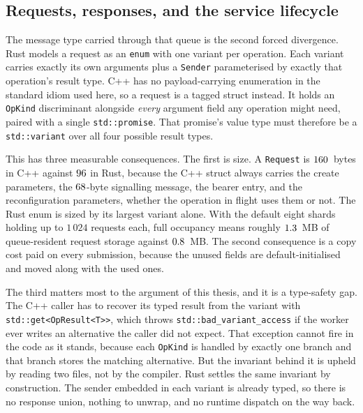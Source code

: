 \documentclass[english,oneside,a4paper,censored,csm,software-track-2020]{HYthesisML}
\begin{document}
\subsection{Requests, responses, and the service lifecycle}\label{sec:tagged}
\label{sec:request}
The message type carried through that queue is the second forced divergence. Rust models a
request as an \texttt{enum} with one variant per
operation. Each variant carries exactly its own arguments plus a \texttt{Sender} parameterised
by exactly that operation's result type. C++ has no payload-carrying
enumeration in the standard idiom used here, so a request is a tagged struct instead. It holds an
\texttt{OpKind} discriminant alongside \emph{every} argument field any operation might need,
paired with a single \texttt{std::promise}. That promise's value type must therefore be a
\texttt{std::variant} over all four possible result types.

This has three measurable consequences. The first is size. A \texttt{Request} is $160$~bytes
in C++ against $96$ in Rust, because the C++ struct always carries the create parameters, the
$68$-byte signalling message, the bearer entry, and the reconfiguration parameters, whether
the operation in flight uses them or not. The Rust enum is sized by its largest variant
alone. With the default eight shards holding up to $1\,024$ requests each, full occupancy means roughly $1.3$~MB of
queue-resident request storage against $0.8$~MB. The second consequence is a copy cost
paid on every submission, because the unused fields are default-initialised and moved along with
the used ones.

The third matters most to the argument of this thesis, and it is a type-safety
gap. The C++ caller has to recover its typed result from the variant with
\texttt{std::get<OpResult<T>>}, which throws \texttt{std::bad\_variant\_access} if the worker
ever writes an alternative the caller did not expect. That exception cannot fire in the
code as it stands, because each \texttt{OpKind} is handled by exactly one branch and that branch
stores the matching alternative. But the invariant behind it is upheld by reading two
files, not by the compiler. Rust settles the same invariant by construction. The sender embedded
in each variant is already typed, so there is no response union, nothing to unwrap, and no
runtime dispatch on the way back.
\end{document}
